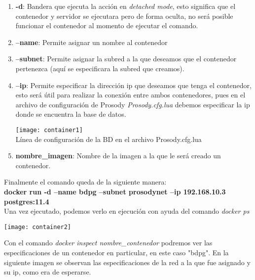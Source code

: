 \documentclass[10pt,letterpaper]{article}
\begin{document}
\begin{enumerate}
\item \textbf{-d}: Bandera que ejecuta la acción en \textit{detached mode}, esto significa que el contenedor y servidor se ejecutara pero de forma oculta, no será posible funcionar el contenedor al momento de ejecutar el comando. 

\item \textbf{--name}: Permite asignar un nombre al contenedor

\item \textbf{--subnet}: Permite asignar la subred a la que deseamos que el contenedor pertenezca (aquí se especificara la subred que creamos).

\item \textbf{--ip}: Permite especificar la dirección ip que deseamos que tenga el contenedor, esto será útil para realizar la conexión entre ambos contenedores, pues en el archivo de configuración de Prosody \textit{Prosody.cfg.lua} debemos especificar la ip donde se encuentra la base de datos.

\begin{center}
\label{configdb}
\texttt{[image: container1]}\\
Línea de configuración de la BD en el archivo Prosody.cfg.lua
\end{center}

\item \textbf{nombre\_imagen}: Nombre de la imagen a la que le será creado un contenedor.

\end{enumerate}

Finalmente el comando queda de la siguiente manera:\\

\textbf{docker run -d --name bdpg --subnet prosodynet --ip 192.168.10.3 postgres:11.4}\\

Una vez ejecutado, podemos verlo en ejecución con ayuda del comando \textit{docker ps}

\begin{center}
\texttt{[image: container2]}
\end{center}

Con el comando \textit{docker inspect nombre\_contenedor} podremos ver las especificaciones de un contenedor en particular, en este caso "bdpg". En la siguiente imagen se observan las especificaciones de la red a la que fue asignado y su ip, como era de esperarse.
\end{document}
